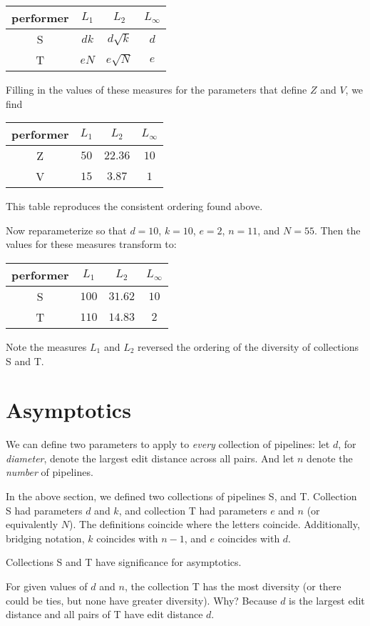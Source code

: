 \documentclass{article}
\begin{document}
\begin{tabular}{c|ccc}
  performer & $L_1$ & $L_2$ & $L_\infty$ \\
\hline
  S & $dk$ & $d \sqrt{k}$ & $d$ \\
  T & $eN$ & $e \sqrt{N}$ & $e$
\end{tabular}

Filling in the values of these measures for the parameters that define
$Z$ and $V$, we find

\begin{tabular}{c|ccc}
  performer & $L_1$ & $L_2$ & $L_\infty$ \\
\hline
  Z & $50$ & $22.36$ & $10$ \\
  V & $15$ & $3.87$ & $1$
\end{tabular}

This table reproduces the consistent ordering found above.

Now reparameterize so that $d = 10$, $k = 10$, $e = 2$, $n = 11$, and
$N = 55$. Then the values for these measures transform to:

\begin{tabular}{c|ccc}
  performer & $L_1$ & $L_2$ & $L_\infty$ \\
  \hline
  S & $100$ & $31.62$ & $10$ \\
  T & $110$ & $14.83$ & $2$
\end{tabular}

Note the measures $L_1$ and $L_2$ reversed the ordering of the
diversity of collections S and T.

\section{Asymptotics}
We can define two parameters to apply to \emph{every} collection of
pipelines: let $d$, for \emph{diameter}, denote the largest edit
distance across all pairs.  And let $n$ denote the \emph{number} of
pipelines.

In the above section, we defined two collections of pipelines S, and
T.  Collection S had parameters $d$ and $k$, and collection T had
parameters $e$ and $n$ (or equivalently $N$).  The definitions
coincide where the letters coincide.  Additionally, bridging notation,
$k$ coincides with $n - 1$, and $e$ coincides with $d$.

Collections S and T have significance for asymptotics.

For given values of $d$ and $n$, the collection T has the most
diversity (or there could be ties, but none have greater diversity).
Why?  Because $d$ is the largest edit distance and all pairs of T have
edit distance $d$.
\end{document}
